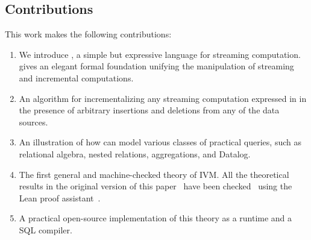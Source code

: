 \subsection{Contributions}

This work makes the following contributions:
\begin{enumerate}
  \item We introduce \dbsp, a simple but expressive language for
    streaming computation. \dbsp gives an elegant formal foundation
    unifying the manipulation of streaming and incremental
    computations.
  \item An algorithm for incrementalizing any streaming
    computation expressed in \dbsp in the presence of arbitrary
    insertions and deletions from any of the data sources.
  \item An illustration of how \dbsp can model various classes of
    practical queries, such as relational algebra, nested relations,
    aggregations, and Datalog.
  \item The first general and machine-checked theory of IVM.  All the
    theoretical results in the original version of this
    paper~\cite{budiu-vldb23} have been checked~\cite{dbsp-theory}
    using the Lean proof assistant~\cite{moura-cade15}.
  \item A practical open-source implementation of this theory as a
    runtime and a SQL compiler.
\end{enumerate}

